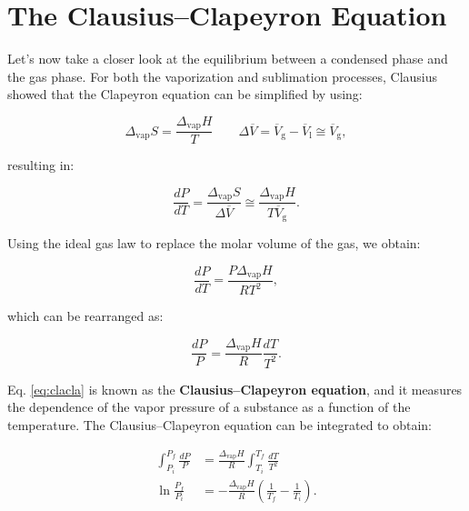 \documentclass[
  9pt,
]{extbook}
\theoremstyle{definition}
\theoremstyle{definition}
\theoremstyle{definition}
\theoremstyle{definition}
\theoremstyle{remark}
\begin{document}
\section{The Clausius--Clapeyron Equation}\label{the-clausiusclapeyron-equation}

Let's now take a closer look at the equilibrium between a condensed phase and the gas phase. For both the vaporization and sublimation processes, Clausius showed that the Clapeyron equation can be simplified by using:

\begin{equation}
 \Delta_{\text{vap}} S = \frac{\Delta_{\text{vap}} H}{T} \qquad \Delta \overline{V}= \overline{V}_{\mathrm{g}} -\overline{V}_{\mathrm{l}} \cong \overline{V}_{\mathrm{g}},
\label{eq:clacla1}
\end{equation}

resulting in:

\begin{equation}
 \frac{dP}{dT} = \frac{ \Delta_{\text{vap}} S}{\Delta \overline{V}} \cong \frac{ \Delta_{\text{vap}} H}{T \overline{V}_{\mathrm{g}}}.
\label{eq:clacla2}
\end{equation}

Using the ideal gas law to replace the molar volume of the gas, we obtain:

\begin{equation}
 \frac{dP}{dT} = \frac{P \Delta_{\text{vap}} H}{RT^2},
\label{eq:clacla3}
\end{equation}

which can be rearranged as:

\begin{equation}
 \frac{dP}{P} = \frac{\Delta_{\text{vap}} H}{R} \frac{dT}{T^2}.
\label{eq:clacla}
\end{equation}

Eq. \eqref{eq:clacla} is known as the \textbf{Clausius--Clapeyron equation}, and it measures the dependence of the vapor pressure of a substance as a function of the temperature. The Clausius--Clapeyron equation can be integrated to obtain:

\begin{equation}
\begin{aligned}
\int_{P_i}^{P_f} \frac{dP}{P} &= \frac{\Delta_{\text{vap}} H}{R} \int_{T_i}^{T_f} \frac{dT}{T^2} \\
\ln \frac{P_f}{P_i} &=-\frac{\Delta_{\text{vap}} H}{R} \left( \frac{1}{T_f}-\frac{1}{T_i} \right).
\end{aligned}
\label{eq:clacla4}
\end{equation}
\end{document}
